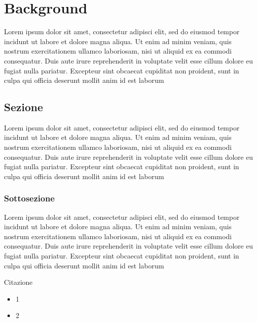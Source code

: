 \chapter{Background}\label{ch:etichtta}


Lorem ipsum dolor sit amet, consectetur adipisci elit, sed do eiusmod tempor incidunt ut labore et dolore magna aliqua. Ut enim ad minim veniam, quis nostrum exercitationem ullamco laboriosam, nisi ut aliquid ex ea commodi consequatur. Duis aute irure reprehenderit in voluptate velit esse cillum dolore eu fugiat nulla pariatur. Excepteur sint obcaecat cupiditat non proident, sunt in culpa qui officia deserunt mollit anim id est laborum


\section{Sezione}

Lorem ipsum dolor sit amet, consectetur adipisci elit, sed do eiusmod tempor incidunt ut labore et dolore magna aliqua. Ut enim ad minim veniam, quis nostrum exercitationem ullamco laboriosam, nisi ut aliquid ex ea commodi consequatur. Duis aute irure reprehenderit in voluptate velit esse cillum dolore eu fugiat nulla pariatur. Excepteur sint obcaecat cupiditat non proident, sunt in culpa qui officia deserunt mollit anim id est laborum

\subsection{Sottosezione}


Lorem ipsum dolor sit amet, consectetur adipisci elit, sed do eiusmod tempor incidunt ut labore et dolore magna aliqua. Ut enim ad minim veniam, quis nostrum exercitationem ullamco laboriosam, nisi ut aliquid ex ea commodi consequatur. Duis aute irure reprehenderit in voluptate velit esse cillum dolore eu fugiat nulla pariatur. Excepteur sint obcaecat cupiditat non proident, sunt in culpa qui officia deserunt mollit anim id est laborum


Citazione\cite{DBLP:conf/nato/Dijkstra96d}


\begin{itemize}
    \item 1
    \item 2
\end{itemize}


